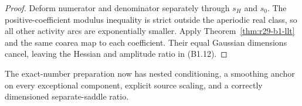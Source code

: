 \begin{proof}
Deform numerator and denominator separately through $s_H$ and $s_0$.  The
positive-coefficient modulus inequality is strict outside the aperiodic real
class, so all other activity arcs are exponentially smaller.  Apply
Theorem~\ref{thm:r29-b1-llt} and the same coarea map to each coefficient.
Their equal Gaussian dimensions cancel, leaving the Hessian and amplitude
ratio in (B1.12).
\end{proof}

The exact-number preparation now has nested conditioning, a smoothing anchor
on every exceptional component, explicit source scaling, and a correctly
dimensioned separate-saddle ratio.

